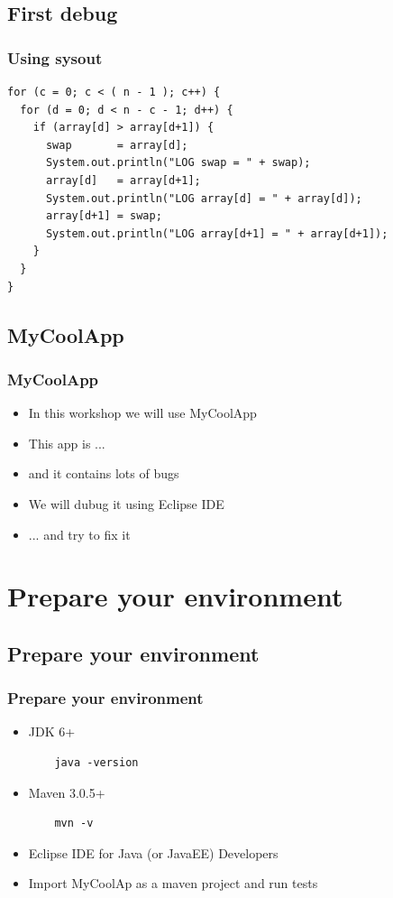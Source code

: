 \documentclass{beamer}
\begin{document}
\subsection{First debug}
\begin{frame}[fragile]
\frametitle{Using sysout}
\begin{lstlisting}
for (c = 0; c < ( n - 1 ); c++) {
  for (d = 0; d < n - c - 1; d++) {
    if (array[d] > array[d+1]) {
      swap       = array[d];
      System.out.println("LOG swap = " + swap);
      array[d]   = array[d+1];
      System.out.println("LOG array[d] = " + array[d]);
      array[d+1] = swap;
      System.out.println("LOG array[d+1] = " + array[d+1]);
    }
  }
}
\end{lstlisting}
\end{frame}

\subsection{MyCoolApp}
\begin{frame}[fragile]
\frametitle{MyCoolApp}
\begin{itemize}
\item In this workshop we will use MyCoolApp
\item This app is ...
\item and it contains lots of bugs
\item We will dubug it using Eclipse IDE
\item ... and try to fix it
\end{itemize}
\end{frame}

\section{Prepare your environment}

\subsection{Prepare your environment}
\begin{frame}[fragile]
\frametitle{Prepare your environment}
\begin{itemize}
\item JDK 6+
  \begin{lstlisting}
    java -version
  \end{lstlisting}
\item Maven 3.0.5+
  \begin{lstlisting}
    mvn -v
  \end{lstlisting}
\item Eclipse IDE for Java (or JavaEE) Developers
\item Import MyCoolAp as a maven project and run tests
\end{itemize}
\end{frame}
\end{document}
